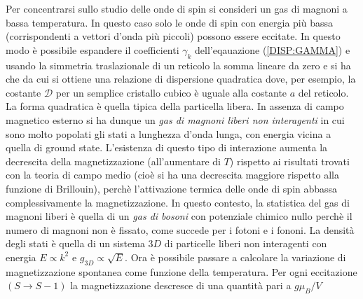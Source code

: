 Per concentrarsi sullo studio delle onde di spin si consideri un gas di magnoni a bassa temperatura. In questo caso solo le onde di spin con energia pi\`u bassa (corrispondenti a vettori d'onda pi\`u piccoli) possono essere eccitate. In questo modo \`e possibile espandere il coefficienti $\gamma_k$ dell'eqauazione (\ref{DISP:GAMMA}) e usando la simmetria traslazionale di un reticolo la somma lineare da zero e si ha che
da cui si ottiene una relazione di dispersione quadratica
dove, per esempio, la costante $\mathcal{D}$ per un semplice cristallo cubico \`e uguale alla costante $a$ del reticolo. La forma quadratica \`e quella tipica della particella libera. In assenza di campo magnetico esterno si ha dunque un \textit{gas di magnoni liberi non interagenti} in cui sono molto popolati gli stati a lunghezza d'onda lunga, con energia vicina a quella di ground state. L'esistenza di questo tipo di interazione aumenta la decrescita della magnetizzazione (all'aumentare di $T$) rispetto ai risultati trovati con la teoria di campo medio (cio\`e si ha una decrescita maggiore rispetto alla funzione di Brillouin), perch\`e l'attivazione termica delle onde di spin abbassa complessivamente la magnetizzazione. 
In questo contesto, la statistica del gas di magnoni liberi \`e quella di un \textit{gas di bosoni} con potenziale chimico nullo perch\`e il numero di magnoni non \`e fissato, come succede per i fotoni e i fononi. La densit\`a degli stati \`e quella di un sistema $3D$ di particelle liberi non interagenti con energia $E\propto k^2$ e $g_{3D} \propto \sqrt{E}$. Ora \`e possibile passare a calcolare la variazione di magnetizzazione spontanea come funzione della temperatura. Per ogni eccitazione $(S\to S-1)$ la magnetizzazione descresce di una quantit\`a pari a $g\mu_B/V$





